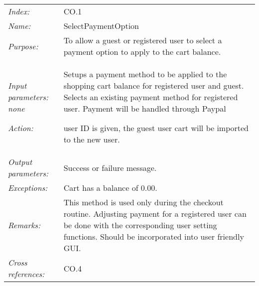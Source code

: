 \documentclass[10pt,letter]{article}
\begin{document}
\begin{tabularx}{\textwidth}{l X}

    \it{Index:} & CO.1 \\

    \it{Name:} & SelectPaymentOption \\

    \it{Purpose:} & To allow a guest or registered user to select a payment option to apply to the cart balance. \\

    \it{Input parameters:} none

    \it{Action:} & Setups a payment method to be applied to the shopping cart balance for registered user and guest. Selects an existing payment method for registered user. Payment will be handled through Paypal

    user ID is given, the guest user cart will be imported to the new user.\\

    \it{Output parameters:} & Success or failure message. \\

    \it{Exceptions:} &  Cart has a balance of $0.00$. \\

    \it{Remarks:} & This method is used only during the checkout routine. Adjusting payment for a registered user can be done with the corresponding user setting functions. Should be incorporated into user friendly GUI.\\

    \it{Cross references:} & CO.4 \\

    \hline

\end{tabularx}
\end{document}
